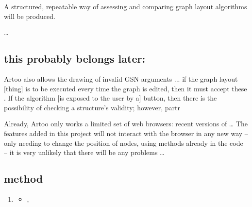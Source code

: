 A structured, repeatable way of assessing and comparing graph layout algorithms will be produced. 

\ldots

\subsection{this probably belongs later:}

Artoo also allows the drawing of invalid GSN arguments ...
if the graph layout [thing] is to be executed every time the graph is edited, then it must accept these .
If the algorithm [is exposed to the user by a] button, then there is the possibility of checking a structure's validity; however, partr

Already, Artoo only works a limited set of web browsers: recent versions of \ldots
The features added in this project will not interact with the browser in any new way -- only needing to change the position of nodes, using methods already in the code -- it is very unlikely that there will be any problems \ldots

\subsection{method}


  \begin{enumerate}
    \item
      \begin{itemize}
      \item ,
    \end{itemize}
  \end{enumerate}

